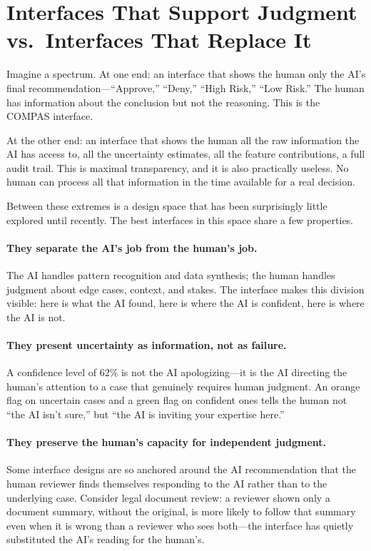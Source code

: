 \section{Interfaces That Support Judgment vs.\ Interfaces That Replace It}
\label{sec:ch6-design-space}

Imagine a spectrum. At one end: an interface that shows the human only the AI's final recommendation---``Approve,'' ``Deny,'' ``High Risk,'' ``Low Risk.'' The human has information about the conclusion but not the reasoning. This is the COMPAS interface.

At the other end: an interface that shows the human all the raw information the AI has access to, all the uncertainty estimates, all the feature contributions, a full audit trail. This is maximal transparency, and it is also practically useless. No human can process all that information in the time available for a real decision.

Between these extremes is a design space that has been surprisingly little explored until recently. The best interfaces in this space share a few properties.

\paragraph{They separate the AI's job from the human's job.} The AI handles pattern recognition and data synthesis; the human handles judgment about edge cases, context, and stakes. The interface makes this division visible: here is what the AI found, here is where the AI is confident, here is where the AI is not.

\paragraph{They present uncertainty as information, not as failure.} A confidence level of 62\% is not the AI apologizing---it is the AI directing the human's attention to a case that genuinely requires human judgment. An orange flag on uncertain cases and a green flag on confident ones tells the human not ``the AI isn't sure,'' but ``the AI is inviting your expertise here.''

\paragraph{They preserve the human's capacity for independent judgment.} Some interface designs are so anchored around the AI recommendation that the human reviewer finds themselves responding to the AI rather than to the underlying case. Consider legal document review: a reviewer shown only a document summary, without the original, is more likely to follow that summary even when it is wrong than a reviewer who sees both---the interface has quietly substituted the AI's reading for the human's.

